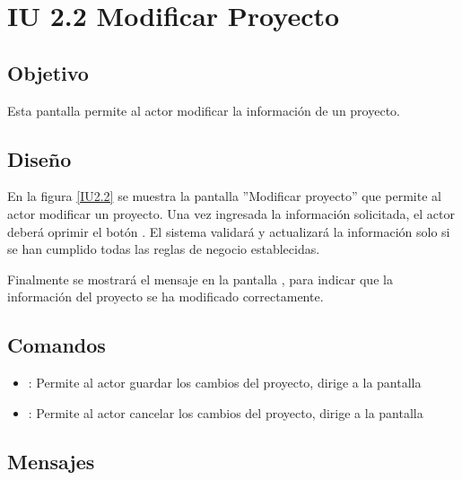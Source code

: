 \section{IU 2.2 Modificar Proyecto}

\subsection{Objetivo}
	Esta pantalla permite al actor modificar la información de un proyecto.
\subsection{Diseño}
	En la figura \ref{IU2.2} se muestra la pantalla ''Modificar proyecto'' que permite al actor modificar un proyecto.
	Una vez ingresada la información solicitada, el actor deberá oprimir el botón  . El sistema validará y actualizará la información solo si se han cumplido todas las reglas de negocio establecidas.
	
	Finalmente se mostrará el mensaje  en la pantalla , para indicar que la información del proyecto se ha modificado correctamente.

\label{IU2.2}
\subsection{Comandos}
\begin{itemize}
	\item {}: Permite al actor guardar los cambios del proyecto, dirige a la pantalla 
	\item {}: Permite al actor cancelar los cambios del proyecto, dirige a la pantalla 
\end{itemize}

\subsection{Mensajes}

